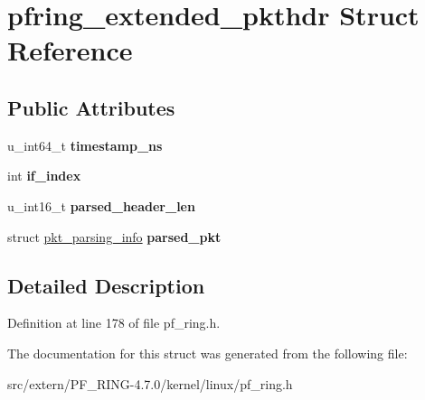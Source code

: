 \hypertarget{structpfring__extended__pkthdr}{
\section{pfring\_\-extended\_\-pkthdr Struct Reference}
\label{structpfring__extended__pkthdr}
}
\subsection*{Public Attributes}
\begin{DoxyCompactItemize}
\item 
\hypertarget{structpfring__extended__pkthdr_ae8543b5843feec5a482fd15cfd287af8}{
u\_\-int64\_\-t {\bfseries timestamp\_\-ns}}
\label{structpfring__extended__pkthdr_ae8543b5843feec5a482fd15cfd287af8}

\item 
\hypertarget{structpfring__extended__pkthdr_a37d339ad1750459793d03efb5d279d35}{
int {\bfseries if\_\-index}}
\label{structpfring__extended__pkthdr_a37d339ad1750459793d03efb5d279d35}

\item 
\hypertarget{structpfring__extended__pkthdr_ada5b1dedbb9fed31e1c72609ec38de19}{
u\_\-int16\_\-t {\bfseries parsed\_\-header\_\-len}}
\label{structpfring__extended__pkthdr_ada5b1dedbb9fed31e1c72609ec38de19}

\item 
\hypertarget{structpfring__extended__pkthdr_acfef8753f2f0fa0cf10acb765cf1da79}{
struct \hyperlink{structpkt__parsing__info}{pkt\_\-parsing\_\-info} {\bfseries parsed\_\-pkt}}
\label{structpfring__extended__pkthdr_acfef8753f2f0fa0cf10acb765cf1da79}

\end{DoxyCompactItemize}


\subsection{Detailed Description}


Definition at line 178 of file pf\_\-ring.h.



The documentation for this struct was generated from the following file:\begin{DoxyCompactItemize}
\item 
src/extern/PF\_\-RING-\/4.7.0/kernel/linux/pf\_\-ring.h\end{DoxyCompactItemize}
